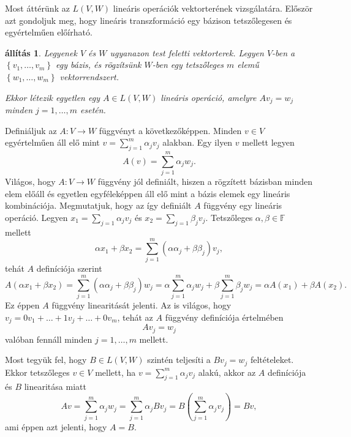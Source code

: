 \documentclass[9pt, showtrims]{memoir}
\makeatletter
\renewenvironment{proof}[1][\proofname]
    {\par\pushQED{\qed}%
    \normalfont \topsep6\p@\@plus6\p@\relax
    \trivlist
    \item[\hskip\labelsep
        \itshape
    #1\@addpunct{:}]\ignorespaces}
    {\popQED\endtrivlist\@endpefalse}
\theoremstyle{plain}
\newtheorem{proposition}{állítás}[section]
\theoremstyle{remark}
\theoremstyle{definition}
\renewcommand{\mathbf}{\mathbb}
\makeatother
\begin{document}
Most áttérünk az $L\left( V,W \right)$ lineáris operációk vektorterének vizsgálatára.
Először azt gondoljuk meg, hogy lineáris transzformáció egy bázison tetszőlegesen és egyértelműen előírható.
\begin{proposition}\label{pr:bazisonegyertelmu}
    Legyenek $V$ és $W$ ugyanazon test feletti vektorterek.
    Legyen $V$-ben a $\left\{ v_1,\dots,v_m \right\}$ egy bázis, 
    és rögzítsünk $W$-ben egy tetszőleges $m$ elemű $\left\{ w_1,\dots,w_m \right\}$ vektorrendszert.

    Ekkor létezik egyetlen egy $A\in L\left( V,W \right)$ lineáris operáció,
    amelyre $Av_j=w_j$ minden $j=1,\dots,m$ esetén.
\end{proposition}
\begin{proof}
    Definiáljuk az $A:V\to W$ függvényt a következőképpen.
    Minden $v\in V$ egyértelműen áll elő mint $v=\sum_{j=1}^m\alpha_jv_j$ alakban.
    Egy ilyen $v$ mellett legyen
    \[
        A\left( v \right)=\sum_{j=1}^m\alpha_jw_j.
    \]
    Világos, hogy $A:V\to W$ függvény jól definiált, hiszen a rögzített bázisban minden elem előáll és egyetlen egyféleképpen
    áll elő mint a bázis elemek egy lineáris kombinációja.
    Megmutatjuk, hogy az így definiált $A$ függvény egy lineáris operáció.
    Legyen $x_1=\sum_{j=1}\alpha_jv_j$ és
    $x_2=\sum_{j=1}\beta_jv_j$.
    Tetszőleges $\alpha,\beta\in\mathbf{F}$ mellett
    \[
        \alpha x_1+\beta x_2=
        \sum_{j=1}^m\left( \alpha\alpha_j+\beta\beta_j \right)v_j,
    \]
    tehát $A$ definíciója szerint
    \[
        A\left( \alpha x_1+\beta x_2 \right)=
        \sum_{j=1}^m\left( \alpha\alpha_j+\beta\beta_j \right)w_j
        =
        \alpha\sum_{j=1}^m\alpha_jw_j+
        \beta\sum_{j=1}^m\beta_jw_j=
        \alpha A\left( x_1 \right)+\beta A\left( x_2 \right).
    \]
    Ez éppen $A$ függvény linearitását jelenti.
    Az is világos, hogy $v_j=0v_1+\ldots+1v_j+\ldots +0v_m$, tehát az $A$ függvény definíciója értelmében
    \[
        Av_j=w_j
    \] valóban fennáll minden $j=1,\dots,m$ mellett.

    Most tegyük fel, hogy $B\in L\left( V,W \right)$ szintén teljesíti a $Bv_j=w_j$ feltételeket.
    Ekkor tetszőleges $v\in V$ mellett, ha $v=\sum_{j=1}^m\alpha_jv_j$ alakú,
    akkor az $A$ definíciója és $B$ linearitása miatt
    \[
        Av=\sum_{j=1}^m\alpha_jw_j=
        \sum_{j=1}^m\alpha_jBv_j=
        B\left( \sum_{j=1}^m\alpha_jv_j \right)=Bv,
    \]
    ami éppen azt jelenti, hogy $A=B$.
\end{proof}
\end{document}
